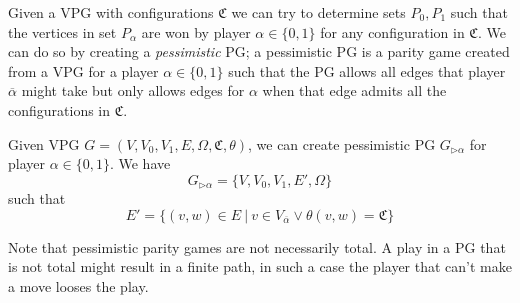 Given a VPG with configurations $\mathfrak{C}$ we can try to determine sets $P_0,P_1$ such that the vertices in set $P_\alpha$ are won by player $\alpha \in \{0,1\}$ for any configuration in $\mathfrak{C}$. We can do so by creating a \textit{pessimistic} PG; a pessimistic PG is a parity game created from a VPG for a player $\alpha \in \{0,1\}$ such that the PG allows all edges that player $\overline{\alpha}$ might take but only allows edges for $\alpha$ when that edge admits all the configurations in $\mathfrak{C}$.
\begin{definition}
	\label{def_pess_game}
	Given VPG $G = (V,V_0,V_1,E,\Omega, \mathfrak{C},\theta)$, we can create pessimistic PG $G_{\triangleright\alpha}$ for player $\alpha \in \{0,1\}$. We have	
	\[ G_{\triangleright\alpha} = \{V,V_0,V_1,E',\Omega \} \]
	such that
	\[ E' = \{ (v,w) \in E\ |\ v \in V_{\overline{\alpha}} \vee \theta(v,w) = \mathfrak{C} \} \]
\end{definition}


Note that pessimistic parity games are not necessarily total. A play in a PG that is not total might result in a finite path, in such a case the player that can't make a move looses the play.


